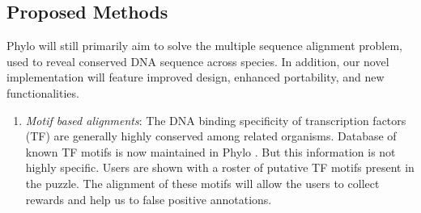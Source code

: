 \documentclass{article}
\begin{document}
\subsection{Proposed Methods}
Phylo will still primarily aim to solve the multiple sequence alignment problem, used to reveal conserved DNA sequence across species. In addition, our novel implementation will feature improved design, enhanced portability, and new functionalities.
\begin{enumerate}
  \item \textit{Motif based alignments}: The DNA binding specificity of transcription factors (TF) are generally highly conserved among related organisms.    
Database of known TF motifs is now maintained in Phylo \cite{heinz2010simple}. But this information is not highly specific. Users are shown with a roster of putative TF motifs present in the puzzle. The alignment of these motifs will allow the users to collect rewards and help us to false positive annotations. 


  

\end{enumerate}
\end{document}
